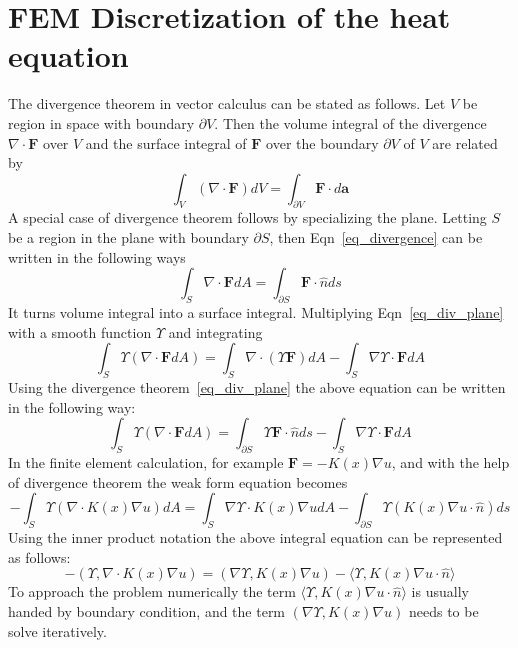 \chapter{FEM Discretization of the heat equation}\label{appen_discretize}

The divergence theorem in vector calculus can be stated as follows. Let $V$ be region in space with boundary $\partial V$. Then the volume integral of the divergence $\nabla \cdot \mathbf{F}$ over $V$ and the surface integral of $\mathbf{F}$ over the boundary $\partial V$ of $V$ are related by
\begin{equation}
\label{eq_divergence}
\int_V \left ( \nabla \cdot \mathbf{F}  \right) dV = \int_{\partial V} \mathbf{F}\cdot d\mathbf{a}
\end{equation} 
A special case of divergence theorem follows by specializing the plane. Letting $S$ be a region in the plane with boundary $\partial S$, then Eqn~\ref{eq_divergence} can be written in the following ways
\begin{equation}
\label{eq_div_plane}
\int_S \nabla \cdot \mathbf{F}dA = \int_{\partial S} \mathbf{F}\cdot \hat{n} ds
\end{equation}
It turns volume integral into a surface integral. Multiplying Eqn~\ref{eq_div_plane} with a smooth function $\Upsilon$ and integrating  
\begin{equation}
\label{eq_test_func}
\int_S \Upsilon\left ( \nabla\cdot \mathbf{F} dA  \right) = \int_S \nabla \cdot \left(\Upsilon \mathbf{F} \right)dA - \int_S \nabla \Upsilon\cdot \mathbf{F}dA 
\end{equation}
Using the divergence theorem~\ref{eq_div_plane} the above equation can be written in the following way:
\begin{equation}
\int_S \Upsilon\left ( \nabla\cdot \mathbf{F} dA  \right) = \int_{\partial S}\Upsilon \mathbf{F} \cdot \hat{n} ds  - \int_S \nabla \Upsilon\cdot \mathbf{F}dA 
\end{equation}
In the finite element calculation, for example $\mathbf{F}=-K(x)\nabla u$, and with the help of divergence theorem the weak form equation becomes
\begin{equation}
-\int_{S} \Upsilon\left(\nabla \cdot K(x) \nabla u \right ) dA = \int_{S} \nabla \Upsilon \cdot K(x) \nabla u dA - \int_{\partial S} \Upsilon \left( K(x) \nabla u\cdot \hat{n}  \right) ds 
\end{equation}
Using the inner product notation the above integral equation can be represented as follows:
\begin{equation}
-\left( \Upsilon, \nabla\cdot K(x) \nabla u \right ) = \left ( \nabla \Upsilon, K(x) \nabla u \right ) - \langle \Upsilon, K(x) \nabla u\cdot \hat{n}\rangle
\end{equation}
To approach the problem numerically the term $ \langle \Upsilon, K(x) \nabla u\cdot \hat{n}\rangle$ is usually handed by boundary condition, and the term $ \left ( \nabla \Upsilon, K(x) \nabla u \right )$  needs to be solve iteratively.
